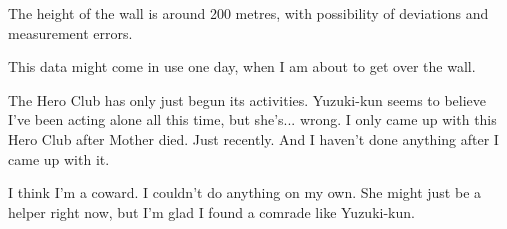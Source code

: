 \begin{center}
\begin{graphpaperBox}[enhanced,box align=center,colframe=diaryborder,width=0.8\textwidth]
The height of the wall is around 200 metres, with possibility of deviations and measurement errors.

This data might come in use one day, when I am about to get over the wall.

The Hero Club has only just begun its activities. Yuzuki-kun seems to believe I've been acting alone all this time, but she's... wrong. I only came up with this Hero Club after Mother died. Just recently. And I haven't done anything after I came up with it.

I think I'm a coward. I couldn't do anything on my own. She might just be a helper right now, but I'm glad I found a comrade like Yuzuki-kun.

\end{graphpaperBox}
\end{center}
